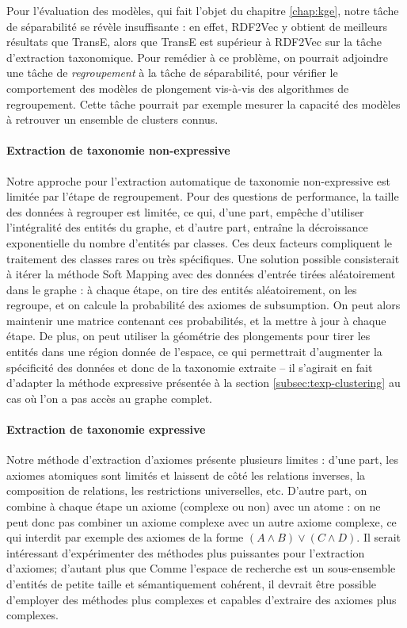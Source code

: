 Pour l'évaluation des modèles, qui fait l'objet du chapitre \ref{chap:kge}, notre tâche de séparabilité se révèle insuffisante : en effet, RDF2Vec y obtient de meilleurs résultats que TransE, alors que TransE est supérieur à RDF2Vec sur la tâche d'extraction taxonomique. Pour remédier à ce problème, on pourrait adjoindre une tâche de \textit{regroupement} à la tâche de séparabilité, pour vérifier le comportement des modèles de plongement vis-à-vis des algorithmes de regroupement. Cette tâche pourrait par exemple mesurer la capacité des modèles à retrouver un ensemble de clusters connus.

\paragraph{Extraction de taxonomie non-expressive}

Notre approche pour l'extraction automatique de taxonomie non-expressive est limitée par l'étape de regroupement. Pour des questions de performance, la taille des données à regrouper est limitée, ce qui, d'une part, empêche d'utiliser l'intégralité des entités du graphe, et d'autre part, entraîne la décroissance exponentielle du nombre d'entités par classes. Ces deux facteurs compliquent le traitement des classes rares ou très spécifiques. 
Une solution possible consisterait à itérer la méthode Soft Mapping avec des données d'entrée tirées aléatoirement dans le graphe : à chaque étape, on tire des entités aléatoirement, on les regroupe, et on calcule la probabilité des axiomes de subsumption. On peut alors maintenir une matrice contenant ces probabilités, et la mettre à jour à chaque étape. De plus, on peut utiliser la géométrie des plongements pour tirer les entités dans une région donnée de l'espace, ce qui permettrait d'augmenter la spécificité des données et donc de la taxonomie extraite – il s'agirait en fait d'adapter la méthode expressive présentée à la section \ref{subsec:texp-clustering} au cas où l'on a pas accès au graphe complet.


\paragraph{Extraction de taxonomie expressive}


Notre méthode d'extraction d'axiomes présente plusieurs limites : d'une part, les axiomes atomiques sont limités et laissent de côté les relations inverses, la composition de relations, les restrictions universelles, etc. D'autre part, on combine à chaque étape un axiome (complexe ou non) avec un atome : on ne peut donc pas combiner un axiome complexe avec un autre axiome complexe, ce qui interdit par exemple des axiomes de la forme $(A \land B) \lor (C \land D)$. Il serait intéressant d'expérimenter des méthodes plus puissantes pour l'extraction d'axiomes; d'autant plus que Comme l'espace de recherche est un sous-ensemble d'entités de petite taille et sémantiquement cohérent, il devrait être possible d'employer des méthodes plus complexes et capables d'extraire des axiomes plus complexes.

